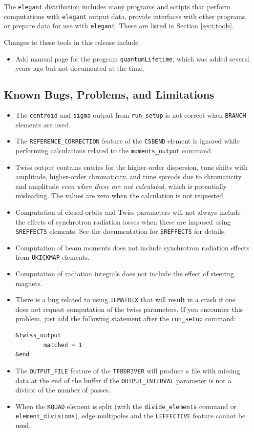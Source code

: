 \documentclass[11pt]{article}
\begin{document}
The {\tt elegant} distribution includes many programs and scripts that perform computations with {\tt elegant}
output data, provide interfaces with other programs, or prepare data for use with {\tt elegant}. These
are listed in Section \ref{sect:tools}. 

Changes to these tools in this release include
\begin{itemize}
\item Add manual page for the program \verb|quantumLifetime|, which was added several years ago but not documented at the time.
\end{itemize}

\subsection{Known Bugs, Problems, and Limitations}
\begin{itemize}
\item The \verb|centroid| and \verb|sigma| output from \verb|run_setup| is not correct when \verb|BRANCH| elements
  are used.
\item The \verb|REFERENCE_CORRECTION| feature of the \verb|CSBEND| element is ignored while performing calculations related
  to the \verb|moments_output| command.
\item Twiss output contains entries for the higher-order dispersion, tune shifts with amplitude, higher-order chromaticity, and tune spreads
  due to chromaticity and amplitude {\em even when these are not calculated}, which is potentially
  misleading.   The values are zero when the calculation is not requested.
\item Computation of closed orbits and Twiss parameters will not always include the effects of synchrotron
  radiation losses when these are imposed using {\tt SREFFECTS} elements.  See
  the documentation for {\tt SREFFECTS} for details.
\item Computation of beam moments does not include synchrotron radiation effects from \verb|UKICKMAP| elements.
\item Computation of radiation integrals does not include the effect of steering magnets.
\item There is a bug related to using {\tt ILMATRIX} that will result in a crash
  if one does not request computation of the twiss parameters. If you encounter this
  problem, just add the following statement after the \verb|run_setup| command:
\begin{verbatim}
&twiss_output
        matched = 1
&end
\end{verbatim}
\item The \verb|OUTPUT_FILE| feature of the \verb|TFBDRIVER| will produce a file with missing data at the end of
  the buffer if the \verb|OUTPUT_INTERVAL| parameter is not a divisor of the number of passes.
\item When the \verb|KQUAD| element is split (with the \verb|divide_elements| command or
  \verb|element_divisions|), edge multipoles and the \verb|LEFFECTIVE| feature cannot be used.
\end{itemize}
\end{document}
